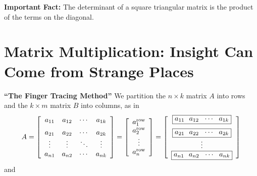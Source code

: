 \documentclass[letterpaper]{book}
\begin{document}
\vspace*{1cm}

{\bf \Large Important Fact: } {\large The determinant of a square triangular matrix is the product of the terms on the diagonal}.\\

\newpage

\setcounter{chapter}{4}
\setcounter{section}{-1}
\section{Matrix Multiplication: Insight Can Come from Strange Places}

{\bf \large ``The Finger Tracing Method''} We partition the $n \times k$ matrix $A$ into rows and the  $k \times m$ matrix $B$ into columns, as in 
\begin{equation}
   A= \left[\begin{array}{cccc} a_{11}& a_{12}& \cdots & a_{1k} \medskip \\
 a_{21}& a_{22}& \cdots & a_{2k}  \\
 \vdots & \vdots&  \ddots & \vdots \\
 a_{n1}& a_{n2}& \cdots & a_{nk} 
 \end{array}\right] = 
\left[\begin{array}{c} a_1^{\rm row}\\
a_2^{\rm row} \\
\vdots \\
a_n^{\rm row}\end{array}\right]  = \left[\begin{array}{c}\boxed{a_{11}~~ a_{12}~~ \cdots~~ a_{1k}}  \medskip \\
\boxed{a_{21}~~ a_{22}~~ \cdots~~ a_{2k}} \\
\vdots \\
\boxed{a_{n1}~~ a_{n2}~~ \cdots~~ a_{nk}}\end{array}\right]
\end{equation}
and
\end{document}
